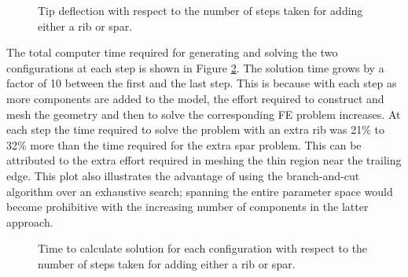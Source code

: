 \documentclass[conf]{new-aiaa}
\begin{document}
\begin{figure}[H]
  \centering
  \caption{ Tip deflection with respect to the number of steps taken
            for adding either a rib or spar.}
  \label{fig:tip_deflection_steps}
\end{figure}

The total computer time required for generating 
and solving the two configurations at each step is shown 
in Figure \ref{fig:solution_time_steps}.
The solution time grows by a factor of 10 between 
the first and the last step. 
This is because with each step as more components are added to the model, 
the effort required to construct and mesh the geometry 
and then to solve the corresponding FE problem increases. 
At each step the time required to solve the problem with an extra rib 
was 21\% to 32\% more than the time required for the extra spar problem. 
This can be attributed to the extra effort required in 
meshing the thin region near the trailing edge.
This plot also illustrates the advantage of
using the branch-and-cut algorithm over an exhaustive search;
spanning the entire parameter space would become prohibitive
with the increasing number of components in the latter approach.

\begin{figure}[H]
  \centering
  \caption{ Time to calculate solution for each configuration 
            with respect to the number of steps taken
            for adding either a rib or spar.}
  \label{fig:solution_time_steps}
\end{figure}
\end{document}
